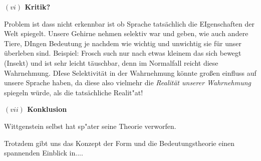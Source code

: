 \documentclass[a4paper, emulatestandardclasses, 12pt]{scrartcl}
\begin{document}
\begin{onehalfspace}
\vspace{5mm}
\noindent\textbf{$(vi)$ Kritik?}	

Problem ist dass nicht erkennbar ist ob Sprache tatsächlich die EIgenschaften der Welt spiegelt. Unsere Gehirne nehmen selektiv war und geben, wie auch andere Tiere, DIngen Bedeutung je nachdem wie wichtig und unwichtig sie für unser überleben sind. Beispiel: Frosch such nur nach etwas kleinem das sich bewegt (Insekt) und ist sehr leicht täuschbar, denn im Normalfall reicht diese Wahrnehmung. DIese Selektivität in der Wahrnehmung könnte großen einfluss auf unsere Sprache haben, da diese also vielmehr die \emph{Realität unserer Wahrnehmung} spiegeln würde, als die tatsächliche Realit"at!

\vspace{5mm}
\noindent\textbf{$(vii)$ Konklusion}

Wittgenstein selbst hat sp"ater seine Theorie verworfen.

Trotzdem gibt uns das Konzept der Form und die Bedeutungstheorie einen spannenden Einblick in....

\end{onehalfspace}
\nocite{*}

\end{document}
